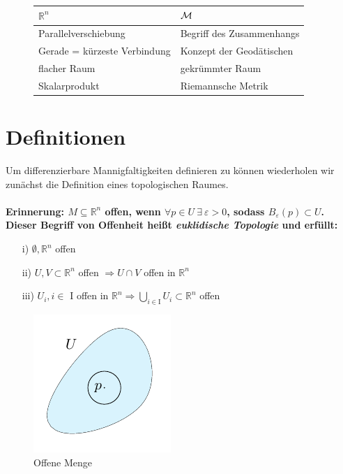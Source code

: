 \begin{figure}[H]
\centering
\begin{tabular}{>{\centering}p{} | >{\centering}p{}} 
$\mathbb{R}^n$ \vspace{5pt} & $\Huge\mathcal{M}$  \vspace{5pt} \tabularnewline \hline 
\vspace{5pt} Parallelverschiebung & \vspace{5pt} Begriff des Zusammenhangs\tabularnewline 
\vspace{5pt} Gerade = kürzeste Verbindung & \vspace{5pt} Konzept der Geodätischen \tabularnewline 
\vspace{5pt} flacher Raum & \vspace{5pt} gekrümmter Raum \tabularnewline 
\vspace{5pt} Skalarprodukt & \vspace{5pt} Riemannsche Metrik \tabularnewline 
\end{tabular}
\end{figure}
\section{Definitionen}
Um differenzierbare Mannigfaltigkeiten definieren zu können wiederholen wir zunächst die Definition eines topologischen Raumes. \\
\phantom{.}\\
\bfseries Erinnerung: \normalfont $M \subseteq \mathbb{R}^n$ offen, wenn $\forall p \in U \ \exists \ \varepsilon>0$, sodass $B_{\varepsilon}(p) \subset U$. Dieser Begriff von Offenheit heißt \textit{euklidische Topologie} \normalfont und erfüllt:
\begin{enumerate}
\item[i)] $\emptyset, \mathbb{R}^n$ offen
\item[ii)] $U, V \subset \mathbb{R}^n$ offen $\Rightarrow U \cap V$ offen in $\mathbb{R}^n$
\item [iii)] $U_i, i \in $ I offen in $\mathbb{R}^n \Rightarrow \bigcup\limits_{i \in \text{I}} U_i \subset \mathbb{R}^n$ offen
\end{enumerate} 


\begin{figure}[H]
\centering
\includegraphics[scale=1.4]{figures/tikz/openset.pdf}
\caption{Offene Menge}
\label{img:offenemenge}
\end{figure} 

